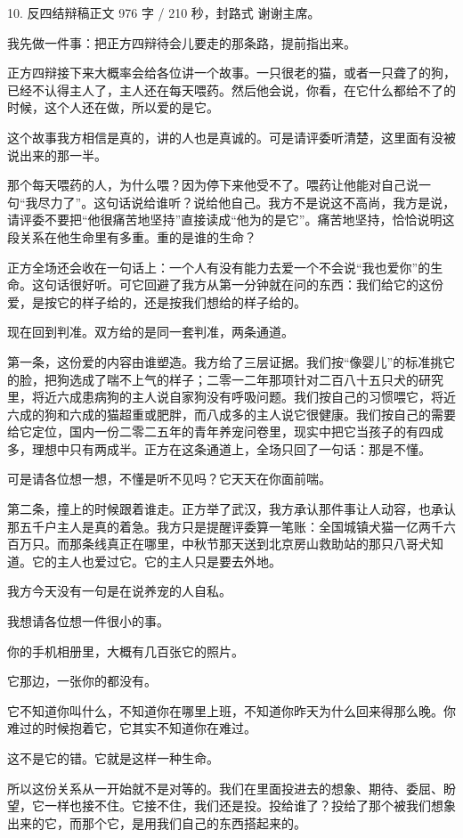 \documentclass[script,con]{debate}
\begin{document}
\begin{speech}{10. 反四结辩稿}{正文 976 字 / 210 秒，封路式}
谢谢主席。

我先做一件事：把正方四辩待会儿要走的那条路，提前指出来。

正方四辩接下来大概率会给各位讲一个故事。一只很老的猫，或者一只聋了的狗，已经不认得主人了，主人还在每天喂药。然后他会说，你看，在它什么都给不了的时候，这个人还在做，所以爱的是它。

这个故事我方相信是真的，讲的人也是真诚的。可是请评委听清楚，这里面有没被说出来的那一半。

那个每天喂药的人，为什么喂？因为停下来他受不了。喂药让他能对自己说一句“我尽力了”。这句话说给谁听？说给他自己。我方不是说这不高尚，我方是说，请评委不要把“他很痛苦地坚持”直接读成“他为的是它”。痛苦地坚持，恰恰说明这段关系在他生命里有多重。重的是谁的生命？

正方全场还会收在一句话上：一个人有没有能力去爱一个不会说“我也爱你”的生命。这句话很好听。可它回避了我方从第一分钟就在问的东西：我们给它的这份爱，是按它的样子给的，还是按我们想给的样子给的。

现在回到判准。双方给的是同一套判准，两条通道。

第一条，这份爱的内容由谁塑造。我方给了三层证据。我们按“像婴儿”的标准挑它的脸，把狗选成了喘不上气的样子；二零一二年那项针对二百八十五只犬的研究里，将近六成患病狗的主人说自家狗没有呼吸问题。我们按自己的习惯喂它，将近六成的狗和六成的猫超重或肥胖，而八成多的主人说它很健康。我们按自己的需要给它定位，国内一份二零二五年的青年养宠问卷里，现实中把它当孩子的有四成多，理想中只有两成半。正方在这条通道上，全场只回了一句话：那是不懂。

可是请各位想一想，不懂是听不见吗？它天天在你面前喘。

第二条，撞上的时候跟着谁走。正方举了武汉，我方承认那件事让人动容，也承认那五千户主人是真的着急。我方只是提醒评委算一笔账：全国城镇犬猫一亿两千六百万只。而那条线真正在哪里，中秋节那天送到北京房山救助站的那只八哥犬知道。它的主人也爱过它。它的主人只是要去外地。

我方今天没有一句是在说养宠的人自私。

我想请各位想一件很小的事。

你的手机相册里，大概有几百张它的照片。

它那边，一张你的都没有。

它不知道你叫什么，不知道你在哪里上班，不知道你昨天为什么回来得那么晚。你难过的时候抱着它，它其实不知道你在难过。

这不是它的错。它就是这样一种生命。

所以这份关系从一开始就不是对等的。我们在里面投进去的想象、期待、委屈、盼望，它一样也接不住。它接不住，我们还是投。投给谁了？投给了那个被我们想象出来的它，而那个它，是用我们自己的东西搭起来的。


\end{speech}
\end{document}
